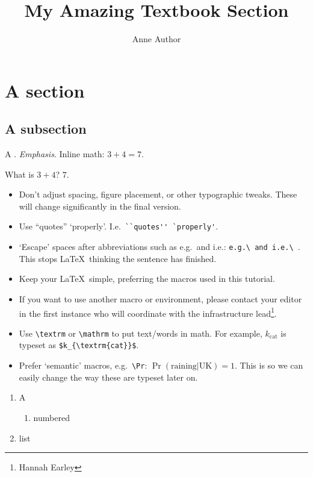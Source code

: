 \title{My Amazing Textbook Section}
\author{Anne Author}
\maketitle

\section{A section}
\subsection{A subsection}

A .
\emph{Emphasis}.
Inline math: $3 + 4 = 7$.

\begin{popquiz}[label=pop:tut:addition]
  What is $3+4$?
\solution
  $7$.
\end{popquiz}


\begin{itemize}
    \item Don't adjust spacing, figure placement, or other typographic tweaks.
          These will change significantly in the final version.
    \item Use ``quotes'' `properly'. I.e.\ \verb|``quotes'' `properly'|.
    \item `Escape' spaces after abbreviations such as e.g.\ and i.e.: \verb|e.g.\ and i.e.\ |.
          This stops \LaTeX\ thinking the sentence has finished.
    \item Keep your \LaTeX\ simple, preferring the macros used in this tutorial.
    \item If you want to use another macro or environment, please contact your editor in the first instance who will coordinate with the infrastructure lead\footnote{Hannah Earley}.
    \item Use \verb|\textrm| or \verb|\mathrm| to put text/words in math.
          For example, $k_{\textrm{cat}}$ is typeset as \verb|$k_{\textrm{cat}}$|.
    \item Prefer `semantic' macros, e.g.\ \verb|\Pr|: $\Pr(\textrm{raining} | \textrm{UK}) = 1$.
          This is so we can easily change the way these are typeset later on.
\end{itemize}

\begin{enumerate}
    \item A
    \begin{enumerate}
        \item numbered
    \end{enumerate}
    \item list
\end{enumerate}

